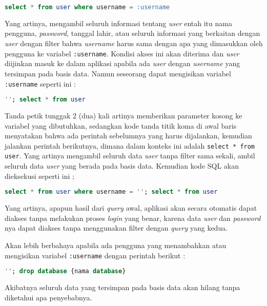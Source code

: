 \documentclass[pdftex,12pt, oneside]{article}
\begin{document}
\begin{itemize}
  \begin{lstlisting}[language=sql]
    select * from user where username = :username
  \end{lstlisting}
  
  Yang artinya, mengambil seluruh informasi tentang \textit{user} entah itu nama pengguna, \textit{password}, tanggal lahir, atau seluruh informasi yang berkaitan dengan \textit{user} dengan filter bahwa \textit{username} harus sama dengan apa yang dimasukkan oleh pengguna ke variabel \texttt{:username}. Kondisi akses ini akan diterima dan \textit{user} diijinkan masuk ke dalam aplikasi apabila ada \textit{user} dengan \textit{username} yang tersimpan pada basis data. Namun seseorang dapat mengisikan variabel \texttt{:username} seperti ini :
  
  \begin{lstlisting}[language=sql]
    ''; select * from user
  \end{lstlisting}
  
  Tanda petik tunggak 2 (dua) kali artinya memberikan parameter kosong ke variabel yang dibutuhkan, sedangkan kode tanda titik koma di awal baris menyatakan bahwa ada perintah sebelumnya yang harus dijalankan, kemudian jalankan perintah berikutnya, dimana dalam konteks ini adalah \texttt{select * from user}. Yang artinya mengambil seluruh data \textit{user} tanpa filter sama sekali, ambil seluruh data \textit{user} yang berada pada basis data. Kemudian kode SQL akan dieksekusi seperti ini ;
  
  \begin{lstlisting}[language=sql]
    select * from user where username = ''; select * from user
  \end{lstlisting}
  
  Yang artinya, apapun hasil dari \textit{query} awal, aplikasi akan secara otomatis dapat diakses tanpa melakukan proses \textit{login} yang benar, karena data \textit{user} dan \textit{password} nya dapat diakses tanpa menggunakan filter dengan \textit{query} yang kedua.
  
  Akan lebih berbahaya apabila ada pengguna yang menambahkan atau mengisikan variabel \texttt{:username} dengan perintah berikut :
  
  \begin{lstlisting}[language=sql]
    ''; drop database {nama database}
  \end{lstlisting}
  
  Akibatnya seluruh data yang tersimpan pada basis data akan hilang tanpa diketahui apa penyebabnya.
  
\end{itemize}
\end{document}
